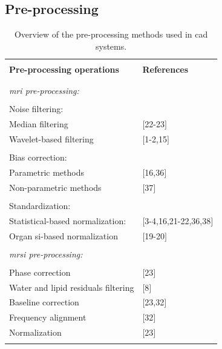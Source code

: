 \def\rmm#1{{\bf \sc Robert: }{\marrow\sf #1}}


\subsection{Pre-processing} \label{subsec:preprocessing}

\begin{table}
	\caption{Overview of the pre-processing methods used in \ac{cad} systems.}
	\small
	\begin{tabular}{p{.65\linewidth} p{.25\linewidth}}
		\hline \\ [-1.5ex]
		\textbf{Pre-processing operations} & \textbf{References} \\ \\ [-1.5ex]
		\hline \\ [-1.5ex]
		\textit{\ac{mri} pre-processing:} & \\ \\ [-1.5ex]
		\quad Noise filtering: &  \\
		\quad \quad Median filtering & $[$22-23$]$  \\
		\quad \quad Wavelet-based filtering & $[$1-2,15$]$ \\ \\ [-1.5ex]
		\quad Bias correction: & \\
		\quad \quad Parametric methods & $[$16,36$]$ \\
		\quad \quad Non-parametric methods & $[$37$]$ \\ \\ [-1.5ex]
		\quad Standardization: & \\
		\quad \quad Statistical-based normalization: & $[$3-4,16,21-22,36,38$]$ \\
		\quad \quad Organ \ac{si}-based normalization & $[$19-20$]$ \\ \\ [-1.5ex]
		\textit{\ac{mrsi} pre-processing:} & \\ \\ [-1.5ex]
		\quad Phase correction & $[$23$]$ \\
		\quad Water and lipid residuals filtering & $[$8$]$ \\
		\quad Baseline correction & $[$23,32$]$ \\
		\quad Frequency alignment & $[$32$]$ \\
		\quad Normalization & $[$23$]$ \\ \\ [-1.5ex]
		\hline
	\end{tabular}
\end{table}

